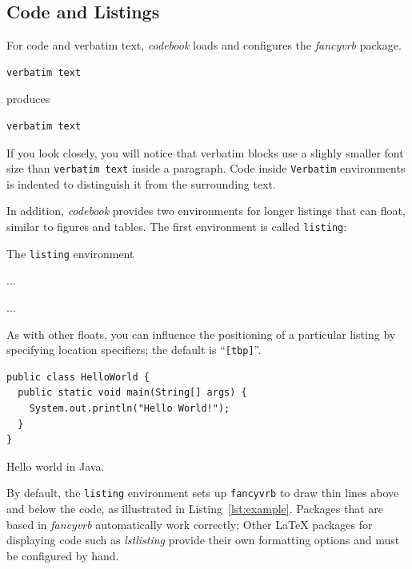 \documentclass[minted]{codebook}
\begin{document}
\subsection{Code and Listings}

For code and verbatim text, \emph{codebook} loads and configures the \emph{fancyvrb} package.
\begin{texcode}
\begin{Verbatim}
verbatim text
\end{Verbatim}
\end{texcode}
produces
\begin{Verbatim}
verbatim text
\end{Verbatim}
If you look closely, you will notice that verbatim blocks use a slighly smaller font size than \Verb|verbatim text| inside a paragraph.
Code inside \verb|Verbatim| environments is indented to distinguish it from the surrounding text.


In addition, \emph{codebook} provides two environments for longer listings that can float, similar to figures and tables.
The first environment is called \verb|listing|:
\begin{lst*}{The \texttt{listing} environment}
\begin{texcode}
\begin{listing}[htb]
...
\caption{...}
\label{...}
\end{listing}
\end{texcode}
\end{lst*}
As with other floats, you can influence the positioning of a particular listing by specifying location specifiers;
the default is ``\texttt{[tbp]}''.

\begin{listing}
\begin{Verbatim}
public class HelloWorld {
  public static void main(String[] args) {
    System.out.println("Hello World!");
  }
}
\end{Verbatim}
\caption{Hello world in Java.}
\label{lst:example}
\end{listing}

\begin{note}
By default, the \texttt{listing} environment sets up \texttt{fancyvrb} to draw thin lines above and below the code, as illustrated in Listing~\ref{lst:example}.
Packages that are based in \emph{fancyvrb} automatically work correctly;
Other \LaTeX{} packages for displaying code such as \emph{lstlisting} provide their own formatting options and must be configured by hand.
\end{note}
\end{document}
